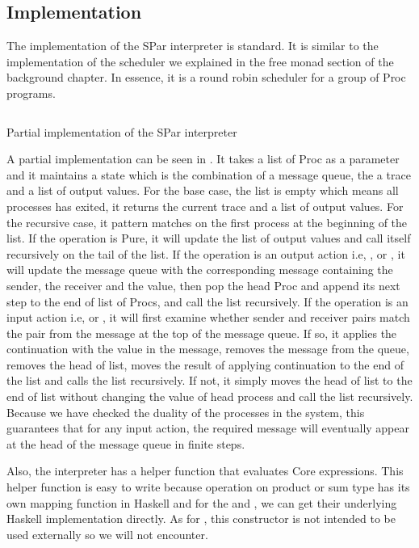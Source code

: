 \subsection{Implementation}
The implementation of the SPar interpreter is standard. It is similar to the implementation of the scheduler we explained in the free monad section of the background chapter. In essence, it is a round robin scheduler for a group of Proc programs. 

\begin{listing}[ht]
\inputminted{Haskell}{impl/interp.hs}
\caption{Partial implementation of the SPar interpreter} 
\label{impl:code:interp} %
\end{listing}

A partial implementation can be seen in . It takes a list of Proc as a parameter and it maintains a state which is the combination of a message queue, the a trace and a list of output values. For the base case, the list is empty which means all processes has exited, it returns the current trace and a list of output values. For the recursive case, it pattern matches on the first process at the beginning of the list. If the operation is Pure, it will update the list of output values and call itself recursively on the tail of the list. If the operation is an output action i.e, ,  or , it will update the message queue with the corresponding message containing the sender, the receiver and the value, then pop the head Proc and append its next step to the end of list of Procs, and call the list recursively. If the operation is an input action i.e,  or , it will first examine whether sender and receiver pairs match the pair from the message at the top of the message queue. If so, it applies the continuation with the value in the message, removes the message from the queue, removes the head of list, moves the result of applying continuation to the end of the list and calls the list recursively. If not, it simply moves the head of list to the end of list without changing the value of head process and call the list recursively. Because we have checked the duality of the processes in the system, this guarantees that for any input action, the required message will eventually appear at the head of the message queue in finite steps.

Also, the interpreter has a helper function that evaluates Core expressions. This helper function is easy to write because operation on product or sum type has its own mapping function in Haskell and for the  and , we can get their underlying Haskell implementation directly. As for , this constructor is not intended to be used externally so we will not encounter.